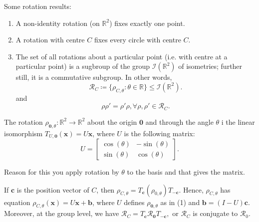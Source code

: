 \begin{corollary}
  Some rotation results:
  \begin{enumerate}
    \item A non-identity rotation (on \( \mathbb{R}^{2} \))  fixes exactly one point.
    \item A rotation with centre \( C \) fixes every circle with centre \( C. \)
    \item The set of all rotations about a particular point (i.e. with centre at a particular point)
      is a sugbroup of the group \( \mathscr{I} \left(\mathbb{R}^{2}  \right) \)
      of isometries; further still, it is a commutative subgroup. 
      In other words,
      \[
        \mathscr{R}_{C} \coloneqq \{\rho_{C, \theta } : \theta \in \mathbb{R}\} \le \mathscr{I}\left(\mathbb{R}^{2}  \right) 
      .\] 
      and
      \[
        \rho \rho' = \rho' \rho, \forall \rho, \rho' \in \mathscr{R}_{C}
      .\] 
  \end{enumerate}

\end{corollary}

\begin{theorem}
\item The rotation \( \rho_{\mathbf{0}, \theta } : \mathbb{R}^{2} \to \mathbb{R}^{2} \) about the origin \( \mathbf{0} \) and through
  the angle \( \theta  \) i the linear isomorphism \( T_{U,\mathbf{0}} \left( \mathbf{x} \right) = U \mathbf{x} \), where \( U \) is the following matrix:
  \[
    U = \begin{bmatrix} \cos \left( \theta  \right) & -\sin \left( \theta  \right) \\ \sin  \left( \theta  \right) & \cos \left( \theta  \right) \end{bmatrix} 
  .\] 

  Reason for this you apply rotation by \( \theta \) to the basis and that gives the matrix.

\item If \( \mathbf{c} \) is the position vector of \( C \), then \( \rho_{C,\theta } = T_{\mathbf{c}}\left(\rho_{0, \theta }  \right)T_{-\mathbf{c}} \).
  Hence, \( \rho_{C,\theta} \) has equation \( \rho_{C, \theta} \left( \mathbf{x} \right) = U \mathbf{x} + \mathbf{b} \), where \( U \) defines \( \rho_{\mathbf{0}, \theta } \) 
  as in (1) and \( \mathbf{b} = \left(I - U  \right) \mathbf{c} \). Moreover, at the group level, we have \( \mathscr{R}_{C} = T_{\mathbf{c}}\mathscr{R}_{\mathbf{0}}T_{-\mathbf{c}}, \)
  or \( \mathscr{R}_{C} \) is conjugate to \( \mathscr{R}_{0} \).
\end{theorem}

